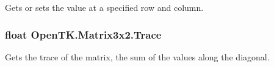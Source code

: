 Gets or sets the value at a specified row and column. 

\hypertarget{struct_open_t_k_1_1_matrix3x2_ae527c0fc1113137ebae8e066f971131e}{
\subsubsection[{Trace}]{\setlength{\rightskip}{0pt plus 5cm}float Open\-T\-K.\-Matrix3x2.\-Trace\hspace{0.3cm}{\ttfamily [get]}}}\label{struct_open_t_k_1_1_matrix3x2_ae527c0fc1113137ebae8e066f971131e}


Gets the trace of the matrix, the sum of the values along the diagonal. 

